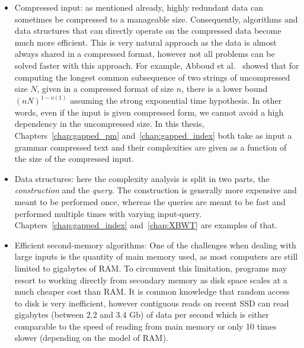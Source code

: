 \begin{itemize}
\item Compressed input: as mentioned already, highly redundant data can sometimes be compressed to a manageable size. 
Consequently, algorithms and data structures that can directly operate on the compressed data become much more efficient. This is very natural approach as the data is almost always shared in a compressed format, however not all problems can be solved faster with this approach. For example, Abboud et al.~\cite{abboud2017fine} showed that for computing the longest common subsequence of two strings of uncompressed size $N$, given in a compressed format of size $n$, there is a lower bound $(nN)^{1-o(1)}$ assuming the strong exponential time hypothesis. In other words, even if the input is given compressed form, we cannot avoid a high dependency in the uncompressed size. In this thesis, 
Chapters~\ref{chap:gapped_pm} and~\ref{chap:gapped_index} both take as input a grammar compressed text and their complexities are given as a function of the size of the compressed input.
\item Data structures: here the complexity analysis is split in two parts, the \emph{construction} and the \emph{query}. The construction is generally more expensive and meant to be performed once, whereas the queries are meant to be fast and performed multiple times with varying input-query.
Chapters~\ref{chap:gapped_index} and~\ref{chap:XBWT} are examples of that.
\item Efficient second-memory algorithms: One of the challenges when dealing with large inputs is the quantity of main memory used, as most computers are still limited to gigabytes of RAM. To circumvent this limitation, programs may resort to working directly from secondary memory as disk space scales at a much cheaper cost than RAM.
It is  common knowledge that random access to disk is very inefficient, however contiguous reads on recent SSD can read gigabytes (between 2.2 and 3.4 Gb) of data per second which is either comparable to the speed of reading from main memory or only 10 times slower (depending on the model of RAM).

\end{itemize}
